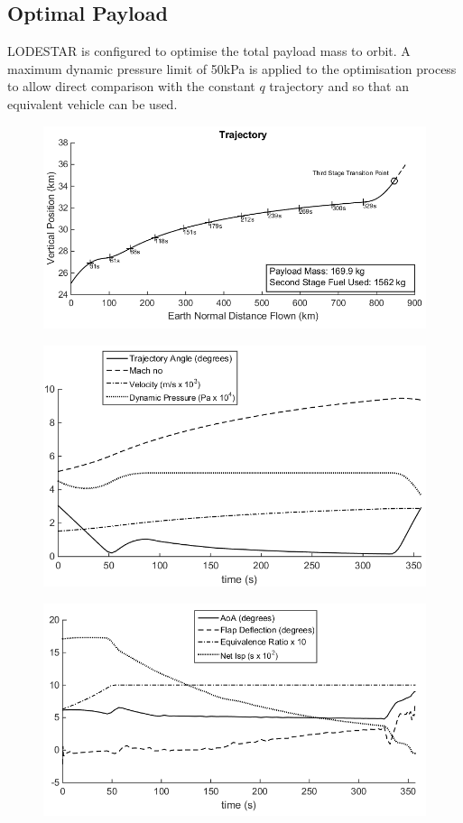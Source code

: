 \subsection{Optimal Payload}


LODESTAR is configured to optimise the total payload mass to orbit.
A maximum dynamic pressure limit of 50kPa is applied to the optimisation process to allow direct comparison with the constant $q$ trajectory and so that an equivalent vehicle can be used.   

\begin{figure}[ht]
	\centering
	\includegraphics[width=0.9\linewidth]{figures/5_Ascent/qlimited50kpa}
	\caption{}
	\label{fig:qlimited50kpa}
\end{figure}
\begin{figure}[ht]
	\centering
	\includegraphics[width=0.8\linewidth]{figures/5_Ascent/qlimited50kpa-Aero}
	\caption{}
	\label{fig:qlimited50kpa-Aero}
\end{figure}
\begin{figure}[ht]
	\centering
	\includegraphics[width=0.8\linewidth]{figures/5_Ascent/qlimited-Vehicle}
	\caption{}
	\label{fig:qlimited-Vehicle}
\end{figure}

